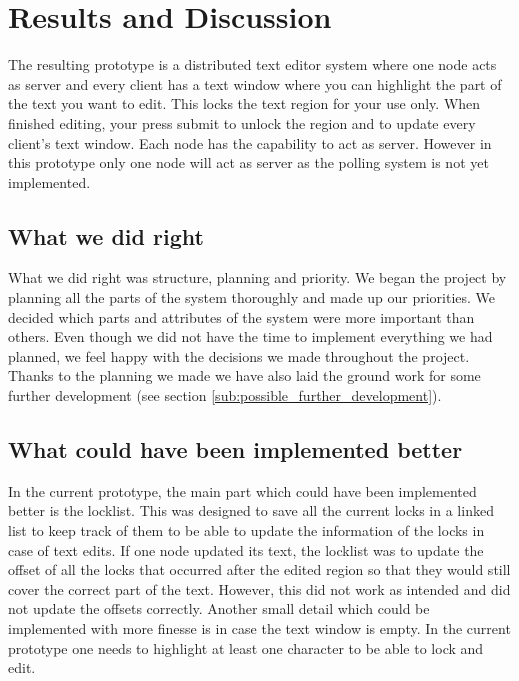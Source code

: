\documentclass[12pt]{article}
\begin{document}

\section{Results and Discussion} %
\label{sec:results_and_discussion}

The resulting prototype is a distributed text editor system where one node acts as server and every client has a text window where you can highlight the part of the text you want to edit. This locks the text region for your use only. When finished editing, your press submit to unlock the region and to update every client's text window. Each node has the capability to act as server. However in this prototype only one node will act as server as the polling system is not yet implemented. 

\subsection{What we did right} %
\label{sub:what_we_did_right}

What we did right was structure, planning and priority. We began the project by planning all the parts of the system thoroughly and made up our priorities. We decided which parts and attributes of the system were more important than others. Even though we did not have the time to implement everything we had planned, we feel happy with the decisions we made throughout the project. Thanks to the planning we made we have also laid the ground work for some further development (see section \ref{sub:possible_further_development}). 


\subsection{What could have been implemented better} %
\label{sub:what_could_have_been_implemented_better}

In the current prototype, the main part which could have been implemented better is the locklist. This was designed to save all the current locks in a linked list to keep track of them to be able to update the information of the locks in case of text edits. If one node updated its text, the locklist was to update the offset of all the locks that occurred after the edited region so that they would still cover the correct part of the text. However, this did not work as intended and did not update the offsets correctly. Another small detail which could be implemented with more finesse is in case the text window is empty. In the current prototype one needs to highlight at least one character to be able to lock and edit. 
\end{document}
